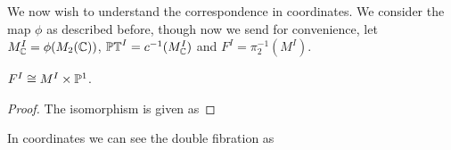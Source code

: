 \documentclass{article}
\begin{document}
We now wish to understand the correspondence in coordinates. We consider the map $\phi$ as described before, though now we send 
for convenience, let $M^I_{\mathbb{C}}= \phi(M_2(\mathbb{C}))$, $\mathbb{PT}^I = c^{-1}(M_{\mathbb{C}}^I)$ and $F^I = \pi_2^{-1}(M^I)$.  
\begin{prop}
	$F^I \cong M^I \times \mathbb{P}^1$. 
\end{prop} 
\begin{proof}
	The isomorphism is given as 
\end{proof}
\begin{corollary}
	In coordinates we can see the double fibration as 
\end{corollary}
\end{document}

